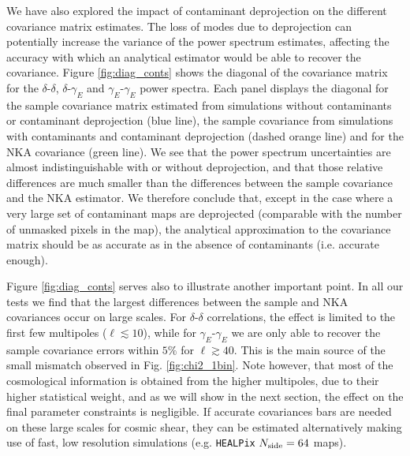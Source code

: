 \documentclass[a4paper,11pt]{article}
\begin{document}
      We have also explored the impact of contaminant deprojection on the different covariance matrix estimates. The loss of modes due to deprojection can potentially increase the variance of the power spectrum estimates, affecting the accuracy with which an analytical estimator would be able to recover the covariance. Figure \ref{fig:diag_conts} shows the diagonal of the covariance matrix for the $\delta$-$\delta$,      $\delta$-$\gamma_E$ and $\gamma_E$-$\gamma_E$ power spectra. Each panel displays the diagonal for the sample covariance matrix estimated from simulations without contaminants or contaminant deprojection (blue
      line), the sample covariance from simulations with contaminants and contaminant deprojection (dashed orange line) and for the NKA covariance   (green line). We see that the power spectrum uncertainties are almost indistinguishable with or without deprojection, and that those relative differences are much smaller than the differences between the sample covariance and the NKA estimator. We therefore conclude that, except in the case where a very large set of contaminant maps are deprojected (comparable with the number of unmasked pixels in the map), the analytical approximation to the covariance matrix should be as accurate as in the absence of contaminants (i.e. accurate enough).
      
      Figure \ref{fig:diag_conts} serves also to illustrate another important point. In all our tests we find that the largest differences between the sample and NKA covariances occur on large scales. For $\delta$-$\delta$ correlations, the effect is limited to the first few multipoles ($\ell\lesssim10$), while for $\gamma_E$-$\gamma_E$ we are only able to recover the sample covariance errors within $5\%$ for $\ell\gtrsim40$. This is the main source of the small mismatch observed in Fig. \ref{fig:chi2_1bin}. Note however, that most of the cosmological information is obtained from the higher multipoles, due to their higher statistical weight, and as we will show in the next section, the effect on the final parameter constraints is negligible. If accurate covariances bars are needed on these large scales for cosmic shear, they can be estimated alternatively making use of fast, low resolution simulations (e.g. {\tt HEALPix} $N_{\rm side}=64$ maps).
\end{document}
